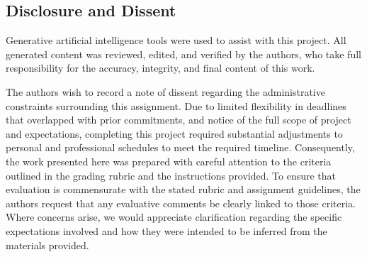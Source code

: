 \documentclass[Afour,sageh,times]{sagej}
\begin{document}
\subsection{Disclosure and Dissent}
\label{sec:disclosure}

Generative artificial intelligence tools were used to assist with this project. All generated content was reviewed, edited, and verified by the authors, who take full responsibility for the accuracy, integrity, and final content of this work. 

The authors wish to record a note of dissent regarding the administrative constraints surrounding this assignment. Due to limited flexibility in deadlines that overlapped with prior commitments, and notice of the full scope of project and expectations, completing this project required substantial adjustments to personal and professional schedules to meet the required timeline. Consequently, the work presented here was prepared with careful attention to the criteria outlined in the grading rubric and the instructions provided. To ensure that evaluation is commensurate with the stated rubric and assignment guidelines, the authors request that any evaluative comments be clearly linked to those criteria. Where concerns arise, we would appreciate clarification regarding the specific expectations involved and how they were intended to be inferred from the materials provided.
\end{document}
